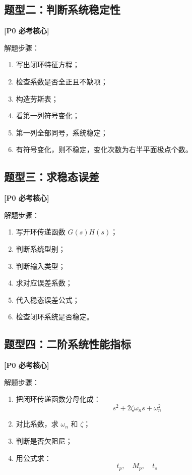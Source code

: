 \documentclass[UTF8,a4paper,12pt]{ctexart}
\newcommand{\Pzero}{\textcolor{p0}{\textbf{[P0 必考核心]}}}
\begin{document}
\subsection{题型二：判断系统稳定性}

\Pzero

解题步骤：

\begin{enumerate}
    \item 写出闭环特征方程；
    \item 检查系数是否全正且不缺项；
    \item 构造劳斯表；
    \item 看第一列符号变化；
    \item 第一列全部同号，系统稳定；
    \item 有符号变化，则不稳定，变化次数为右半平面极点个数。
\end{enumerate}

\subsection{题型三：求稳态误差}

\Pzero

解题步骤：

\begin{enumerate}
    \item 写开环传递函数 $G(s)H(s)$；
    \item 判断系统型别；
    \item 判断输入类型；
    \item 求对应误差系数；
    \item 代入稳态误差公式；
    \item 检查闭环系统是否稳定。
\end{enumerate}

\subsection{题型四：二阶系统性能指标}

\Pzero

解题步骤：

\begin{enumerate}
    \item 把闭环传递函数分母化成：
    \[
    s^2+2\zeta\omega_ns+\omega_n^2
    \]
    \item 对比系数，求 $\omega_n$ 和 $\zeta$；
    \item 判断是否欠阻尼；
    \item 用公式求：
    \[
    t_p,\quad M_p,\quad t_s
    \]
\end{enumerate}
\end{document}
